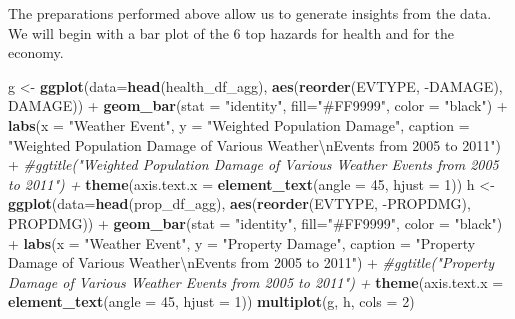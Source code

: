 \documentclass[]{article}
\newenvironment{Shaded}{\begin{snugshade}}{\end{snugshade}}
\newcommand{\KeywordTok}[1]{\textcolor[rgb]{0.13,0.29,0.53}{\textbf{{#1}}}}
\newcommand{\DataTypeTok}[1]{\textcolor[rgb]{0.13,0.29,0.53}{{#1}}}
\newcommand{\DecValTok}[1]{\textcolor[rgb]{0.00,0.00,0.81}{{#1}}}
\newcommand{\CharTok}[1]{\textcolor[rgb]{0.31,0.60,0.02}{{#1}}}
\newcommand{\StringTok}[1]{\textcolor[rgb]{0.31,0.60,0.02}{{#1}}}
\newcommand{\CommentTok}[1]{\textcolor[rgb]{0.56,0.35,0.01}{\textit{{#1}}}}
\newcommand{\NormalTok}[1]{{#1}}
\begin{document}
The preparations performed above allow us to generate insights from the
data. We will begin with a bar plot of the 6 top hazards for health and
for the economy.

\begin{Shaded}
\begin{Highlighting}[]
\NormalTok{g <-}\StringTok{ }\KeywordTok{ggplot}\NormalTok{(}\DataTypeTok{data=}\KeywordTok{head}\NormalTok{(health_df_agg), }\KeywordTok{aes}\NormalTok{(}\KeywordTok{reorder}\NormalTok{(EVTYPE, -DAMAGE), DAMAGE)) +}
\StringTok{  }\KeywordTok{geom_bar}\NormalTok{(}\DataTypeTok{stat =} \StringTok{"identity"}\NormalTok{, }\DataTypeTok{fill=}\StringTok{"#FF9999"}\NormalTok{, }\DataTypeTok{color =} \StringTok{"black"}\NormalTok{) +}\StringTok{ }
\StringTok{  }\KeywordTok{labs}\NormalTok{(}\DataTypeTok{x =} \StringTok{"Weather Event"}\NormalTok{, }\DataTypeTok{y =} \StringTok{"Weighted Population Damage"}\NormalTok{,}
       \DataTypeTok{caption =} \StringTok{"Weighted Population Damage of Various Weather}\CharTok{\textbackslash{}n}\StringTok{Events from 2005 to 2011"}\NormalTok{) +}\StringTok{ }
\StringTok{  }\CommentTok{#ggtitle("Weighted Population Damage of Various Weather Events from 2005 to 2011") + }
\StringTok{  }\KeywordTok{theme}\NormalTok{(}\DataTypeTok{axis.text.x =} \KeywordTok{element_text}\NormalTok{(}\DataTypeTok{angle =} \DecValTok{45}\NormalTok{, }\DataTypeTok{hjust =} \DecValTok{1}\NormalTok{))}
\NormalTok{h <-}\StringTok{ }\KeywordTok{ggplot}\NormalTok{(}\DataTypeTok{data=}\KeywordTok{head}\NormalTok{(prop_df_agg), }\KeywordTok{aes}\NormalTok{(}\KeywordTok{reorder}\NormalTok{(EVTYPE, -PROPDMG), PROPDMG)) +}
\StringTok{  }\KeywordTok{geom_bar}\NormalTok{(}\DataTypeTok{stat =} \StringTok{"identity"}\NormalTok{, }\DataTypeTok{fill=}\StringTok{"#FF9999"}\NormalTok{, }\DataTypeTok{color =} \StringTok{"black"}\NormalTok{) +}\StringTok{ }
\StringTok{  }\KeywordTok{labs}\NormalTok{(}\DataTypeTok{x =} \StringTok{"Weather Event"}\NormalTok{, }\DataTypeTok{y =} \StringTok{"Property Damage"}\NormalTok{,}
       \DataTypeTok{caption =} \StringTok{"Property Damage of Various Weather}\CharTok{\textbackslash{}n}\StringTok{Events from 2005 to 2011"}\NormalTok{) +}\StringTok{ }
\StringTok{  }\CommentTok{#ggtitle("Property Damage of Various Weather Events from 2005 to 2011") + }
\StringTok{  }\KeywordTok{theme}\NormalTok{(}\DataTypeTok{axis.text.x =} \KeywordTok{element_text}\NormalTok{(}\DataTypeTok{angle =} \DecValTok{45}\NormalTok{, }\DataTypeTok{hjust =} \DecValTok{1}\NormalTok{))}
\KeywordTok{multiplot}\NormalTok{(g, h, }\DataTypeTok{cols =} \DecValTok{2}\NormalTok{)}
\end{Highlighting}
\end{Shaded}
\end{document}
